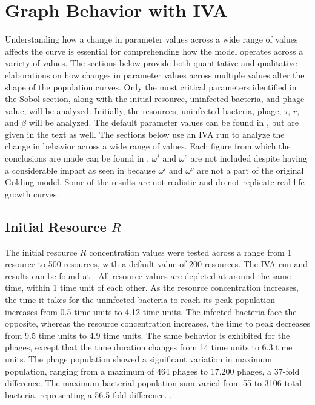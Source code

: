 \section{Graph Behavior with IVA}
Understanding how a change in parameter values across a wide range of values affects the curve is essential for comprehending how the model operates across a variety of values. 
The sections below provide both quantitative and qualitative elaborations on how changes in parameter values across multiple values alter the shape of the population curves. 
Only the most critical parameters identified in the Sobol section, along with the initial resource, uninfected bacteria, and phage value, will be analyzed. 
Initially, the resources, uninfected bacteria, phage, $\tau$, $r$, and $\beta$ will be analyzed. 
The default parameter values can be found in , but are given in the text as well. 
The sections below use an IVA run to analyze the change in behavior across a wide range of values. 
Each figure from which the conclusions are made can be found in . 
$\omega^i$ and $\omega^o$ are not included despite having a considerable impact as seen in  because $\omega^i$ and $\omega^o$ are not a part of the original Golding model. 
Some of the results are not realistic and do not replicate real-life growth curves. 

\subsection{Initial Resource $R$}
The initial resource $R$ concentration values were tested across a range from 1 resource to 500 resources, with a default value of 200 resources. 
The IVA run and results can be found at . 
All resource values are depleted at around the same time, within 1 time unit of each other. 
As the resource concentration increases, the time it takes for the uninfected bacteria to reach its peak population increases from 0.5 time units to 4.12 time units. 
The infected bacteria face the opposite, whereas the resource concentration increases, the time to peak decreases from 9.5 time units to 4.9 time units. 
The same behavior is exhibited for the phages, except that the time duration changes from 14 time units to 6.3 time units. 
The phage population showed a significant variation in maximum population, ranging from a maximum of 464 phages to 17,200 phages, a 37-fold difference. 
The maximum bacterial population sum varied from 55 to 3106 total bacteria, representing a 56.5-fold difference. . 

